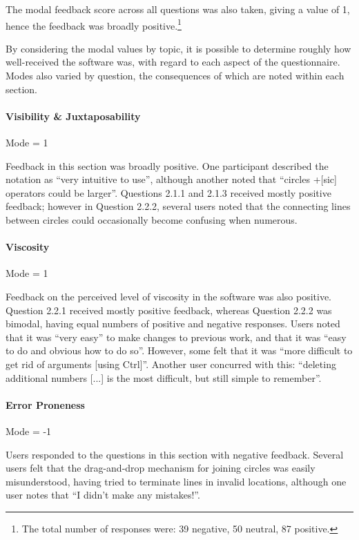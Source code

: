 \documentclass[12pt,twoside,notitlepage,xetex]{report}
\begin{document}
The modal feedback score across all questions was also taken, giving a value of 1, hence the feedback was broadly positive.\footnote{The total number of responses were: 39 negative, 50 neutral, 87 positive.}

By considering the modal values by topic, it is possible to determine roughly how well-received the software was, with regard to each aspect of the questionnaire.  Modes also varied by question, the consequences of which are noted within each section.

\paragraph{Visibility \& Juxtaposability}\hfill

Mode = 1

Feedback in this section was broadly positive.  One participant described the notation as ``very intuitive to use'', although another noted that ``circles +[sic] operators could be larger''.  Questions 2.1.1 and 2.1.3 received mostly positive feedback; however in Question 2.2.2, several users noted that the connecting lines between circles could occasionally become confusing when numerous.

\paragraph{Viscosity}\hfill

Mode = 1

Feedback on the perceived level of viscosity in the software was also positive. Question 2.2.1 received mostly positive feedback, whereas Question 2.2.2 was bimodal, having equal numbers of positive and negative responses.  Users noted that it was ``very easy'' to make changes to previous work, and that it was ``easy to do and obvious how to do so''.  However, some felt that it was ``more difficult to get rid of arguments [using Ctrl]''.  Another user concurred with this: ``deleting additional numbers [...] is the most difficult, but still simple to remember''.

\paragraph{Error Proneness}\hfill

Mode = -1

Users responded to the questions in this section with negative feedback.  Several users felt that the drag-and-drop mechanism for joining circles was easily misunderstood, having tried to terminate lines in invalid locations, although one user notes that ``I didn't make any mistakes!''.
\end{document}
